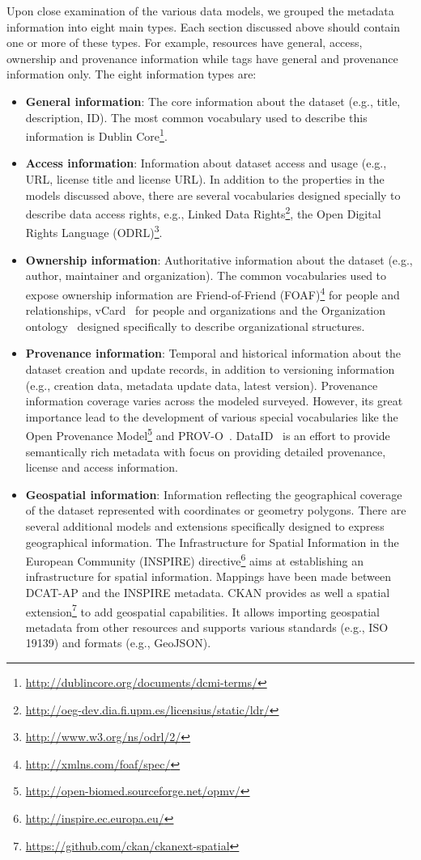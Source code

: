 Upon close examination of the various data models, we grouped the metadata information into eight main types. Each section discussed above should contain one or more of these types. For example, resources have general, access, ownership and provenance information while tags have general and provenance information only. The eight information types are:
\begin{itemize}
 \item \textbf{General information}: The core information about the dataset (e.g., title, description, ID). The most common vocabulary used to describe this information is Dublin Core\footnote{\url{http://dublincore.org/documents/dcmi-terms/}}.
 \item \textbf{Access information}: Information about dataset access and usage (e.g., URL, license title and license URL). In addition to the properties in the models discussed above, there are several vocabularies designed specially to describe data access rights, e.g., Linked Data Rights\footnote{\url{http://oeg-dev.dia.fi.upm.es/licensius/static/ldr/}}, the Open Digital Rights Language (ODRL)\footnote{\url{http://www.w3.org/ns/odrl/2/}}.
 \item \textbf{Ownership information}: Authoritative information about the dataset (e.g., author, maintainer and organization). The common vocabularies used to expose ownership information are Friend-of-Friend (FOAF)\footnote{\url{http://xmlns.com/foaf/spec/}} for people and relationships, vCard~\cite{Iannella:W3C:14} for people and organizations and the Organization ontology~\cite{Reynolds:W3C:14} designed specifically to describe organizational structures.
 \item \textbf{Provenance information}: Temporal and historical information about the dataset creation and update records, in addition to versioning information (e.g., creation data, metadata update data, latest version). Provenance information coverage varies across the modeled surveyed. However, its great importance lead to the development of various special vocabularies like the Open Provenance Model\footnote{\url{http://open-biomed.sourceforge.net/opmv/}} and PROV-O~\cite{Lebo:W3C:13}. DataID~\cite{Brummer::ICSS:14} is an effort to provide semantically rich metadata with focus on providing detailed provenance, license and access information.
 \item \textbf{Geospatial information}: Information reflecting the geographical coverage of the dataset represented with coordinates or geometry polygons. There are several additional models and extensions specifically designed to express geographical information. The Infrastructure for Spatial Information in the European Community (INSPIRE) directive\footnote{\url{http://inspire.ec.europa.eu/}} aims at establishing an infrastructure for spatial information. Mappings have been made between DCAT-AP and the INSPIRE metadata. CKAN provides as well a spatial extension\footnote{\url{https://github.com/ckan/ckanext-spatial}} to add geospatial capabilities. It allows importing geospatial metadata from other resources and supports various standards (e.g., ISO 19139) and formats (e.g., GeoJSON).

\end{itemize}
